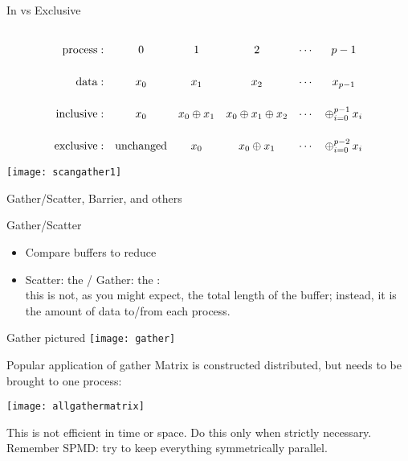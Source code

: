 \begin{numberedframe}{In vs Exclusive}
  \def\strut{\vrule height 25pt width 0pt\relax}
\[
\begin{array}{rccccc}
  \mathrm{process:}\strut
      &0&1&2&\cdots&p-1\\
  \mathrm{data:}\strut
      &x_0&x_1&x_2&\cdots&x_{p-1}\\
  \mathrm{inclusive:}\strut
      &x_0&x_0\oplus x_1&x_0\oplus x_1\oplus x_2&\cdots&\mathop\oplus_{i=0}^{p-1} x_i\\
  \mathrm{exclusive:}\strut
      &\mathrm{unchanged}&x_0&x_0\oplus x_1&\cdots&\mathop\oplus_{i=0}^{p-2} x_i\\
\end{array}
\]
\end{numberedframe}



\begin{exerciseframe}[scangather]
  \label{fig:scanints}
  
  \texttt{[image: scangather1]}
\end{exerciseframe}

 {Gather/Scatter, Barrier, and others}


\begin{numberedframe}{Gather/Scatter}
\begin{itemize}
\item Compare buffers to reduce
\item Scatter: the  / Gather: the :\\
this is not, as you might expect, the total length of the
buffer; instead, it is the amount of data to/from each process.
\end{itemize}
\end{numberedframe}

\begin{numberedframe}{Gather pictured}
  \texttt{[image: gather]}
\end{numberedframe}

\begin{numberedframe}{Popular application of gather}
  Matrix is constructed distributed, but needs to be brought to one
  process:
  
  \texttt{[image: allgathermatrix]}

  This is not efficient in time or space. Do this
  only when strictly necessary. Remember SPMD: try to keep everything
  symmetrically parallel. 
\end{numberedframe}

